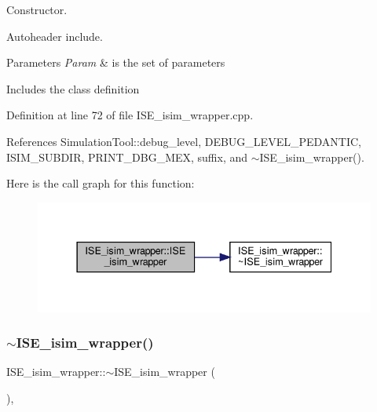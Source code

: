 Constructor. 

Autoheader include.


\begin{DoxyParams}{Parameters}
{\em Param} & is the set of parameters\\
\hline
\end{DoxyParams}
Includes the class definition 

Definition at line 72 of file I\+S\+E\+\_\+isim\+\_\+wrapper.\+cpp.



References Simulation\+Tool\+::debug\+\_\+level, D\+E\+B\+U\+G\+\_\+\+L\+E\+V\+E\+L\+\_\+\+P\+E\+D\+A\+N\+T\+IC, I\+S\+I\+M\+\_\+\+S\+U\+B\+D\+IR, P\+R\+I\+N\+T\+\_\+\+D\+B\+G\+\_\+\+M\+EX, suffix, and $\sim$\+I\+S\+E\+\_\+isim\+\_\+wrapper().

Here is the call graph for this function\+:
\nopagebreak
\begin{figure}[H]
\begin{center}
\leavevmode
\includegraphics[width=337pt]{d2/d37/classISE__isim__wrapper_a7a45e55d837ba7c7c24cc7db77bc529c_cgraph}
\end{center}
\end{figure}
\mbox{\label{classISE__isim__wrapper_ad3813f02064fe3ccccbc42dac0e8c8d2}} 
\subsubsection{\texorpdfstring{$\sim$\+I\+S\+E\+\_\+isim\+\_\+wrapper()}{~ISE\_isim\_wrapper()}}
{\footnotesize\ttfamily I\+S\+E\+\_\+isim\+\_\+wrapper\+::$\sim$\+I\+S\+E\+\_\+isim\+\_\+wrapper (\begin{DoxyParamCaption}{ }\end{DoxyParamCaption})\hspace{0.3cm}{\ttfamily [override]}, {\ttfamily [default]}}



